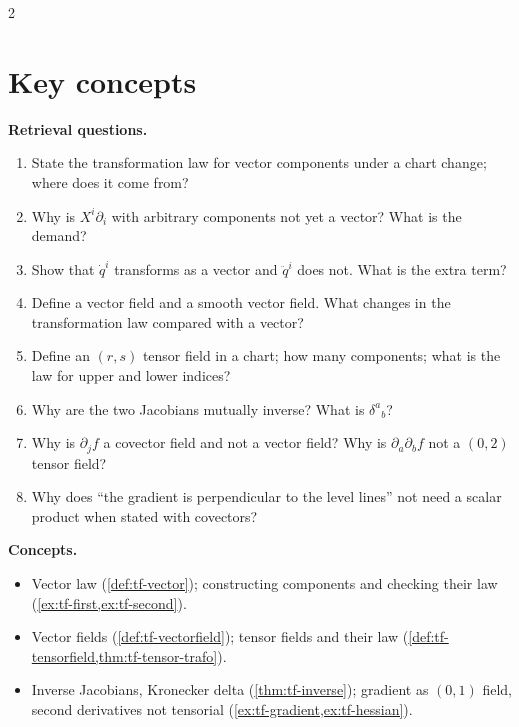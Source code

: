 \begin{paracol}{2}
\section*{Key concepts}
\begin{keyconcepts}
\textbf{Retrieval questions.}
\begin{enumerate}
  \item State the transformation law for vector components under a chart change; where does it come from?
  \item Why is $X^i\partial_i$ with arbitrary components not yet a vector? What is the demand?
  \item Show that $\dot q^i$ transforms as a vector and $\ddot q^i$ does not. What is the extra term?
  \item Define a vector field and a smooth vector field. What changes in the transformation law compared with a vector?
  \item Define an $(r,s)$ tensor field in a chart; how many components; what is the law for upper and lower indices?
  \item Why are the two Jacobians mutually inverse? What is $\delta^a{}_b$?
  \item Why is $\partial_jf$ a covector field and not a vector field? Why is $\partial_a\partial_bf$ not a $(0,2)$ tensor field?
  \item Why does ``the gradient is perpendicular to the level lines'' not need a scalar product when stated with covectors?
\end{enumerate}
\textbf{Concepts.}
\begin{itemize}
  \item Vector law (\cref{def:tf-vector}); constructing components and checking their law (\cref{ex:tf-first,ex:tf-second}).
  \item Vector fields (\cref{def:tf-vectorfield}); tensor fields and their law (\cref{def:tf-tensorfield,thm:tf-tensor-trafo}).
  \item Inverse Jacobians, Kronecker delta (\cref{thm:tf-inverse}); gradient as $(0,1)$ field, second derivatives not tensorial
        (\cref{ex:tf-gradient,ex:tf-hessian}).
\end{itemize}
\end{keyconcepts}

\flushside
\end{paracol}
